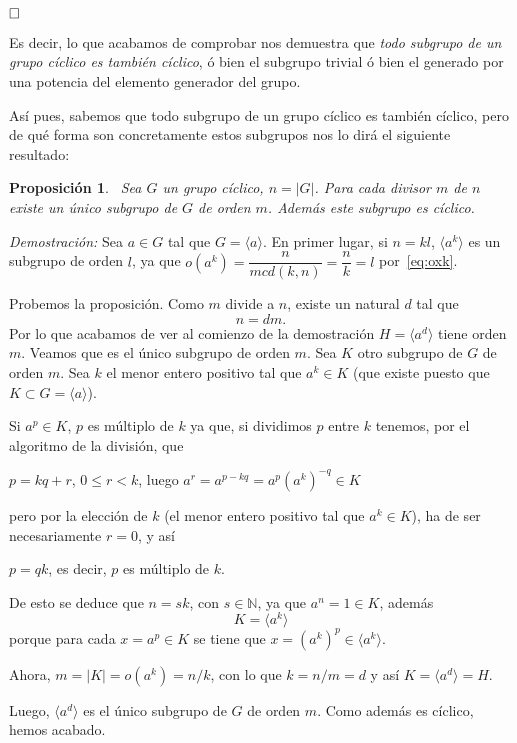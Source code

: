 \documentclass[12pt]{article}
\newtheorem{proposition}[theorem]{Proposición}
\begin{document}
$\hfill \square$

Es decir, lo que acabamos de comprobar nos demuestra que \textit{todo subgrupo de un grupo cíclico es también cíclico}, ó bien el subgrupo trivial ó bien el generado por una potencia del elemento generador del grupo.

Así pues, sabemos que todo subgrupo de un grupo cíclico es también cíclico, pero de qué forma son concretamente estos subgrupos nos lo dirá el siguiente resultado:

\begin{proposition}~\label{eq:ciclico}Sea $G$ un grupo cíclico, $n = |G|$. Para cada divisor $m$ de $n$ existe un único subgrupo de $G$ de orden $m$. Además este subgrupo es cíclico.
\end{proposition}
\emph{Demostración: }Sea $a \in G$ tal que $G = \langle a \rangle$. En primer lugar, 
si $n= kl$, $\langle a^{k} \rangle$ es un subgrupo de orden $l$, ya que $o(a^{k}) = \dfrac{n}{mcd(k,n)} = \dfrac{n}{k} = l$ por~\ref{eq:oxk}.

Probemos la proposición. Como $m$ divide a $n$, existe un natural $d$ tal que $$n = dm.$$
Por lo que acabamos de ver al comienzo de la demostración $H = \langle a^{d} \rangle$ tiene orden $m$. Veamos que es el único subgrupo de orden $m$. Sea $K$ otro subgrupo de $G$ de orden $m$. Sea $k$ el menor entero positivo tal que $a^{k} \in K$ (que existe puesto que $K \subset G = \langle a \rangle$).

Si $a^{p} \in K$, $p$ es múltiplo de $k$ ya que, si dividimos $p$ entre $k$ tenemos,  por el algoritmo de la división, que 
\begin{center}
$p = kq + r$, $0 \leq r < k$, luego $a^{r} = a^{p-kq} = a^{p}(a^{k})^{-q} \in K$
\end{center}
pero por la elección de $k$ (el menor entero positivo tal que $a^{k} \in K$), ha de ser necesariamente $r = 0$, y así 
\begin{center}
$p= qk$, es decir, $p$ es múltiplo de $k$.
\end{center}
De esto se deduce que $n= sk$, con $s \in \mathbb{N}$, ya que $a^{n} = 1 \in K$, además $$K = \langle a^{k} \rangle$$ porque para cada $x = a^{p} \in K$ se tiene que $x = (a^{k})^{p} \in \langle a^{k} \rangle$.

Ahora, $m = |K| = o(a^{k}) = n/k$, con lo que $k = n/m = d$ y así $K = \langle a^{d} \rangle = H$.

Luego, $\langle a^{d} \rangle$ es el único subgrupo de $G$ de orden $m$. Como además es cíclico, hemos acabado.
\end{document}
